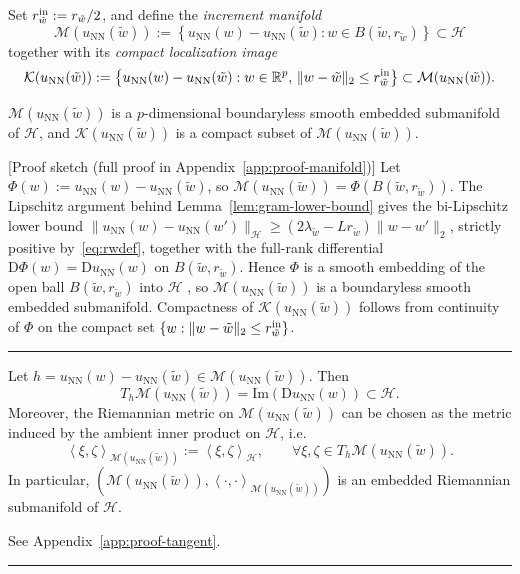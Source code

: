 \documentclass[twoside,11pt]{article}
\newcommand{\BlackBoxProof}{\rule{1.5ex}{1.5ex}}
\renewenvironment{proof}{\par\noindent{\bf Proof\ }}{\hfill\BlackBoxProof\par\medskip}
\newcommand{\rev}[1]{#1}                           %
\newcommand{\ip}[1]{\left\langle #1 \right\rangle}
\newcommand{\R}{\mathbb{R}}
\newcommand{\D}{\mathrm{D}}
\newcommand{\NN}{\mathrm{NN}}
\newcommand{\calH}{\mathcal{H}}
\newcommand{\calK}{\mathcal{K}}
\newcommand{\calM}{\mathcal{M}}
\begin{document}
Set $r^{\rm in}_{\tilde w} := r_{\tilde w}/2$, and define the \emph{increment manifold}
\begin{equation}\label{eq:Mn}
    \mathcal{M}( u_\NN(\tilde w)) := \left\{ u_\NN(w) - u_\NN(\tilde w) : w \in B(\tilde w, r_{\tilde w}) \right\} \subset \calH
\end{equation}
together with its \emph{compact localization image}
\begin{equation}\label{eq:Kn}
    \mathcal{K}( u_\NN(\tilde w)) := \left\{ u_\NN(w) - u_\NN(\tilde w) : w \in \R^p,\,\|w-\tilde w\|_2 \le r^{\rm in}_{\tilde w} \right\} \subset \mathcal{M}( u_\NN(\tilde w)).
\end{equation}


\begin{proposition}\label{prop:manifold}
$\mathcal{M}( u_\NN(\tilde w))$ is a $p$-dimensional boundaryless smooth embedded submanifold of $\mathcal{H}$, and $\calK(u_\NN(\tilde w))$ is a compact subset of $\calM(u_\NN(\tilde w))$.
\end{proposition}
\rev{%
\begin{proof}[Proof sketch (full proof in Appendix~\ref{app:proof-manifold})]
Let $\Phi(w) := u_\NN(w) - u_\NN(\tilde w)$, so $\calM(u_\NN(\tilde w)) = \Phi(B(\tilde w, r_{\tilde w}))$. The Lipschitz argument behind Lemma~\ref{lem:gram-lower-bound} gives the bi-Lipschitz lower bound $\|u_\NN(w) - u_\NN(w')\|_{\calH} \ge (2\lambda_{\tilde w} - Lr_{\tilde w})\|w - w'\|_2$, strictly positive by~\eqref{eq:rwdef}, together with the full-rank differential $\D\Phi(w) = \D u_\NN(w)$ on $B(\tilde w, r_{\tilde w})$. Hence $\Phi$ is a smooth embedding of the open ball $B(\tilde w, r_{\tilde w})$ into $\calH$ \citep[Prop.~5.30]{Lee2003}, so $\calM(u_\NN(\tilde w))$ is a boundaryless smooth embedded submanifold. Compactness of $\calK(u_\NN(\tilde w))$ follows from continuity of $\Phi$ on the compact set $\{w : \|w-\tilde w\|_2 \le r^{\rm in}_{\tilde w}\}$.
\end{proof}
}


\begin{proposition}\label{prop:tangent_metric}
Let $h=u_\NN(w)-u_\NN(\tilde w)\in \mathcal{M}(u_\NN(\tilde w))$. Then
\[
T_h\mathcal{M}(u_\NN(\tilde w))=\mathrm{Im}(\mathrm D u_\NN(w))\subset \mathcal H.
\]
Moreover, the Riemannian metric on $\mathcal{M}(u_\NN(\tilde w))$ can be chosen as the metric
induced by the ambient inner product on $\mathcal H$, i.e.
\[
\ip{\xi,\zeta}_{\mathcal{M}(u_\NN(\tilde w))}:=\ip{\xi,\zeta}_{\mathcal H},
\qquad \forall \xi,\zeta\in T_h\mathcal{M}(u_\NN(\tilde w)).
\]
In particular, $(\mathcal{M}(u_\NN(\tilde w)),\ip{\cdot,\cdot}_{\mathcal{M}(u_\NN(\tilde w))})$
is an embedded Riemannian submanifold of $\mathcal H$.
\end{proposition}
\begin{proof}
See Appendix~\ref{app:proof-tangent}.
\end{proof}
\end{document}
